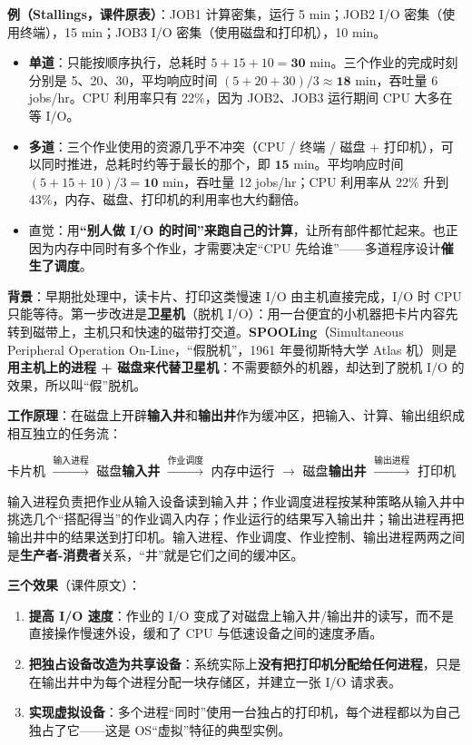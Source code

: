 \textbf{例（Stallings，课件原表）}：JOB1 计算密集，运行 5 min；JOB2 I/O 密集（使用终端），15 min；JOB3 I/O 密集（使用磁盘和打印机），10 min。
\begin{itemize}
    \item \textbf{单道}：只能按顺序执行，总耗时 $5+15+10=\mathbf{30}$ min。三个作业的完成时刻分别是 5、20、30，平均响应时间 $(5+20+30)/3\approx\mathbf{18}$ min，吞吐量 6 jobs/hr。CPU 利用率只有 22\%，因为 JOB2、JOB3 运行期间 CPU 大多在等 I/O。
    \item \textbf{多道}：三个作业使用的资源几乎不冲突（CPU / 终端 / 磁盘 + 打印机），可以同时推进，总耗时约等于最长的那个，即 $\mathbf{15}$ min。平均响应时间 $(5+15+10)/3=\mathbf{10}$ min，吞吐量 12 jobs/hr；CPU 利用率从 22\% 升到 43\%，内存、磁盘、打印机的利用率也大约翻倍。
    \item 直觉：用\textbf{“别人做 I/O 的时间”来跑自己的计算}，让所有部件都忙起来。也正因为内存中同时有多个作业，才需要决定“CPU 先给谁”——多道程序设计\textbf{催生了调度}。
\end{itemize}

\textbf{背景}：早期批处理中，读卡片、打印这类慢速 I/O 由主机直接完成，I/O 时 CPU 只能等待。第一步改进是\textbf{卫星机}（脱机 I/O）：用一台便宜的小机器把卡片内容先转到磁带上，主机只和快速的磁带打交道。\textbf{SPOOLing}（Simultaneous Peripheral Operation On-Line，“假脱机”，1961 年曼彻斯特大学 Atlas 机）则是\textbf{用主机上的进程 + 磁盘来代替卫星机}：不需要额外的机器，却达到了脱机 I/O 的效果，所以叫“假”脱机。

\textbf{工作原理}：在磁盘上开辟\textbf{输入井}和\textbf{输出井}作为缓冲区，把输入、计算、输出组织成相互独立的任务流：
\begin{center}
卡片机 $\xrightarrow{\text{输入进程}}$ 磁盘\textbf{输入井} $\xrightarrow{\text{作业调度}}$ 内存中运行 $\to$ 磁盘\textbf{输出井} $\xrightarrow{\text{输出进程}}$ 打印机
\end{center}
输入进程负责把作业从输入设备读到输入井；作业调度进程按某种策略从输入井中挑选几个“搭配得当”的作业调入内存；作业运行的结果写入输出井；输出进程再把输出井中的结果送到打印机。输入进程、作业调度、作业控制、输出进程两两之间是\textbf{生产者-消费者}关系，“井”就是它们之间的缓冲区。

\textbf{三个效果}（课件原文）：
\begin{enumerate}
    \item \textbf{提高 I/O 速度}：作业的 I/O 变成了对磁盘上输入井/输出井的读写，而不是直接操作慢速外设，缓和了 CPU 与低速设备之间的速度矛盾。
    \item \textbf{把独占设备改造为共享设备}：系统实际上\textbf{没有把打印机分配给任何进程}，只是在输出井中为每个进程分配一块存储区，并建立一张 I/O 请求表。
    \item \textbf{实现虚拟设备}：多个进程“同时”使用一台独占的打印机，每个进程都以为自己独占了它——这是 OS“虚拟”特征的典型实例。
\end{enumerate}

